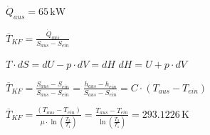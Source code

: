 \( \dot{Q}_{aus} = 65 \, \text{kW} \)  

\( \overline{T}_{KF} = \frac{\dot{Q}_{aus}}{S_{aus} - S_{ein}} \)  

\( T \cdot dS = dU - p \cdot dV = dH \)  
\( dH = U + p \cdot dV \)  

\( \overline{T}_{KF} = \frac{S_{aus} - S_{ein}}{S_{aus} - S_{ein}} = \frac{h_{aus} - h_{ein}}{S_{aus} - S_{ein}} = C \cdot (T_{aus} - T_{ein}) \)  

\( \overline{T}_{KF} = \frac{(T_{aus} - T_{ein})}{\mu \cdot \ln \left( \frac{T_2}{T_1} \right)} = \frac{T_{aus} - T_{ein}}{\ln \left( \frac{T_2}{T_1} \right)} = 293.1226 \, \text{K} \)